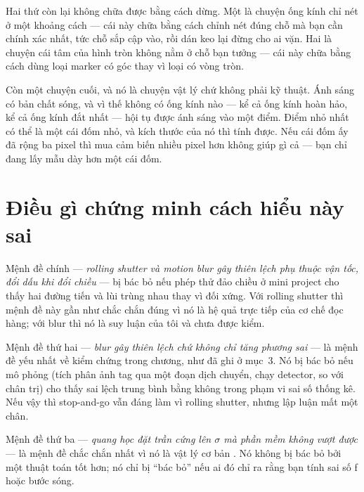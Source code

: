\documentclass[../../marker.tex]{subfiles}
\begin{document}
\begin{dongian}
Hai thứ còn lại không chữa được bằng cách dừng. Một là chuyện ống kính chỉ nét ở một khoảng cách --- cái này chữa bằng cách chỉnh nét đúng chỗ mà bạn cần chính xác nhất, tức chỗ sắp cập vào, rồi dán keo lại đừng cho ai vặn. Hai là chuyện cái tâm của hình tròn không nằm ở chỗ bạn tưởng --- cái này chữa bằng cách dùng loại marker có góc thay vì loại có vòng tròn.

Còn một chuyện cuối, và nó là chuyện vật lý chứ không phải kỹ thuật. Ánh sáng có bản chất sóng, và vì thế không có ống kính nào --- kể cả ống kính hoàn hảo, kể cả ống kính đắt nhất --- hội tụ được ánh sáng vào một điểm. Điểm nhỏ nhất có thể là một cái đốm nhỏ, và kích thước của nó thì tính được. Nếu cái đốm ấy đã rộng ba pixel thì mua cảm biến nhiều pixel hơn không giúp gì cả --- bạn chỉ đang lấy mẫu dày hơn một cái đốm.

\end{dongian}

\section{Điều gì chứng minh cách hiểu này sai}

Mệnh đề chính --- \emph{rolling shutter và motion blur gây thiên lệch phụ thuộc vận tốc, đổi dấu khi đổi chiều} --- bị bác bỏ nếu phép thử đảo chiều ở mini project cho thấy hai đường tiến và lùi trùng nhau thay vì đối xứng. Với rolling shutter thì mệnh đề này gần như chắc chắn đúng vì nó là hệ quả trực tiếp của cơ chế đọc hàng; với blur thì nó là suy luận của tôi và chưa được kiểm.

Mệnh đề thứ hai --- \emph{blur gây thiên lệch chứ không chỉ tăng phương sai} --- là mệnh đề yếu nhất về kiểm chứng trong chương, như đã ghi ở mục~3. Nó bị bác bỏ nếu mô phỏng (tích phân ảnh tag qua một đoạn dịch chuyển, chạy detector, so với chân trị) cho thấy sai lệch trung bình bằng không trong phạm vi sai số thống kê. Nếu vậy thì stop-and-go vẫn đáng làm vì rolling shutter, nhưng lập luận mất một chân.

Mệnh đề thứ ba --- \emph{quang học đặt trần cứng lên \(\sigma\) mà phần mềm không vượt được} --- là mệnh đề chắc chắn nhất vì nó là vật lý cơ bản \cite{goodman2005fourier}. Nó không bị bác bỏ bởi một thuật toán tốt hơn; nó chỉ bị ``bác bỏ'' nếu ai đó chỉ ra rằng bạn tính sai số f hoặc bước sóng.
\end{document}
